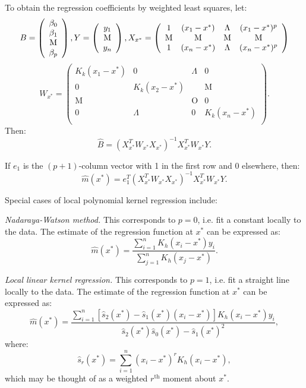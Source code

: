 To obtain the regression coefficients by weighted least squares, let:
$$B=\left(\begin{array}{c}\beta_0\\\beta_1\\\textrm{M}\\\beta_p\end{array}\right),\space 
Y=\left(\begin{array}{c}y_1\\\textrm{M}\\y_n\end{array}\right),\space 
X_{x^*}=\left(\begin{array}{cccc}1&(x_1-x^*)&\Lambda &(x_1-x^*)^p\\\textrm{M}&\textrm{M}&\textrm{M}&\textrm{M}\\1&(x_n-x^*)&\Lambda &(x_n-x^*)^p
\end{array}\right)$$
$$W_{x^*}=\left(\begin{array}{cccc}
K_k(x_1-x^*)&0&\Lambda&0\\
0&K_k(x_2-x^*)&&\textrm{M}\\
\textrm{M}&&\textrm{O}&0\\
0&\Lambda&0&K_k(x_n-x^*)\\
\end{array}\right).$$
Then:
\begin{equation}
\hat{B}=(X^T_{x^*}W_{x^*}X_{x^*})^{-1}X^T_{x^*}W_{x^*}Y.
\end{equation}

If $e_1$ is the $(p + 1)$-column vector with 1 in the first row and 0 elsewhere, then:
\begin{equation}
\hat{m}(x^*)=e_1^T(X^T_{x^*}W_{x^*}X_{x^*})^{-1}X^T_{x^*}W_{x^*}Y.
\end{equation}

Special cases of local polynomial kernel regression include:

\begin{asparaenum}[(a)]
\item {\it Nadaraya-Watson method.} This corresponds to $p = 0$, i.e. fit a constant locally to the data. The estimate of the regression function at $x^*$ can be expressed as:
\begin{equation}
\hat{m}(x^*)=\frac{\sum^n_{i=1}K_h(x_i-x^*)y_i}{\sum^n_{j=1}K_h(x_j-x^*)}.
\end{equation}
\item {\it Local linear kernel regression.} This corresponds to $p = 1$, i.e. fit a straight line locally to the data. The estimate of the regression function at $x^*$ can be expressed as:
\begin{equation}
\hat{m}(x^*)=\frac{\sum^n_{i=1}[\hat{s}_2(x^*)-\hat{s}_1(x^*)(x_i-x^*)]K_h(x_i-x^*)y_i}{\hat{s}_2(x^*)\hat{s}_0(x^*)-\hat{s}_1(x^*)^2},
\end{equation}
where:
\begin{equation}
\hat{s}_r(x^*)=\sum^n_{i=1}(x_i-x^*)^rK_h(x_i-x^*),
\end{equation}
which may be thought of as a weighted $r^{\textrm{th}}$ moment about $x^*$.
\end{asparaenum}

